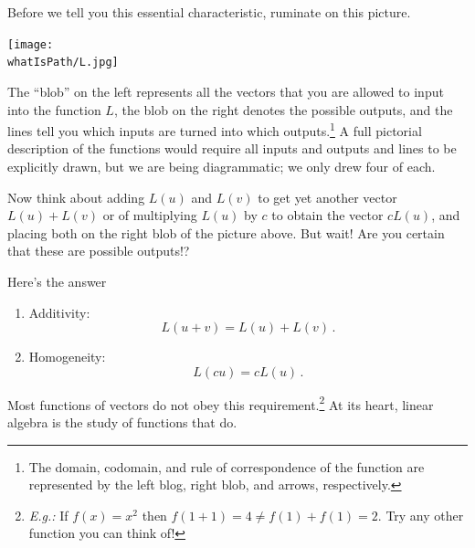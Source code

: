 Before we tell you this essential characteristic, 
ruminate on this picture. 

\begin{center}
\texttt{[image: \\whatIsPath/L.jpg]}
\end{center}

The ``blob'' on the left represents all the vectors that you are allowed to input into the function $L$,  the blob on the right denotes the
possible outputs, and the lines tell you which inputs are turned into which outputs.\footnote{The domain, codomain, and rule of correspondence of the function are represented by the left blog, right blob, and arrows, respectively.} A full pictorial description of the functions would require all inputs and outputs and lines to be explicitly drawn, but we are being diagrammatic; we only drew four of each.  




Now think about adding $L(u)$ and $L(v)$ to get yet another vector $L(u)+L(v)$ or of multiplying $L(u)$ by $c$ to obtain the vector $cL(u)$, and placing both on the right blob of the picture above. 
But wait! Are you certain that these are possible outputs!?

Here's the answer 
\begin{center}
\end{center}
\begin{enumerate}
\item Additivity:
\[L(u+v)=L(u)+L(v)\, .\]
\item Homogeneity:
\[L(cu)=cL(u)\, .\]
\end{enumerate}

\noindent Most functions of vectors do not obey this requirement.\!\footnote{{\itshape E.g.:} If $f(x)=x^2$ then $f(1+1)=4 \neq f(1)+f(1)=2$. Try any other function you can think of!}  At its heart, linear algebra is the study of functions that do. 

